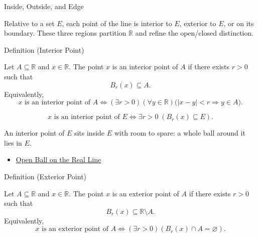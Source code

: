 \label{sec:interior-exterior-boundary}

\begin{topicbox}{Inside, Outside, and Edge}
\begin{exposition}
Relative to a set $E$, each point of the line is interior to $E$, exterior to $E$, or on its boundary. These three regions partition $\mathbb{R}$ and refine the open/closed distinction.
\end{exposition}
\end{topicbox}
\begin{definitionbox}{Definition (Interior Point)}
\begin{definition}
\label{def:interior-point}
Let $A\subseteq\mathbb{R}$ and $x\in\mathbb{R}$.  The point $x$ is an
interior point of $A$ if there exists $r>0$ such that
\[
  B_r(x)\subseteq A.
\]
Equivalently,
\[
  x\text{ is an interior point of }A
  \Longleftrightarrow
  (\exists r>0)(\forall y\in\mathbb{R})
  \bigl(|x-y|<r\Longrightarrow y\in A\bigr).
\]
\end{definition}
\end{definitionbox}
\begin{remark*}
\[
x \text{ is an interior point of } E \Longleftrightarrow \exists r>0\;(B_{r}(x)\subseteq E).
\]
\end{remark*}
\begin{remark*}[Interpretation]
An interior point of $E$ sits inside $E$ with room to spare: a whole ball around it lies in $E$.
\end{remark*}
\begin{dependencies}
\begin{itemize}
  \item \hyperref[def:open-ball]{Open Ball on the Real Line}
\end{itemize}
\end{dependencies}
\begin{definitionbox}{Definition (Exterior Point)}
\begin{definition}
\label{def:exterior-point}
Let $A\subseteq\mathbb{R}$ and $x\in\mathbb{R}$.  The point $x$ is an
exterior point of $A$ if there exists $r>0$ such that
\[
  B_r(x)\subseteq\mathbb{R}\setminus A.
\]
Equivalently,
\[
  x\text{ is an exterior point of }A
  \Longleftrightarrow
  (\exists r>0)(B_r(x)\cap A=\varnothing).
\]
\end{definition}
\end{definitionbox}
